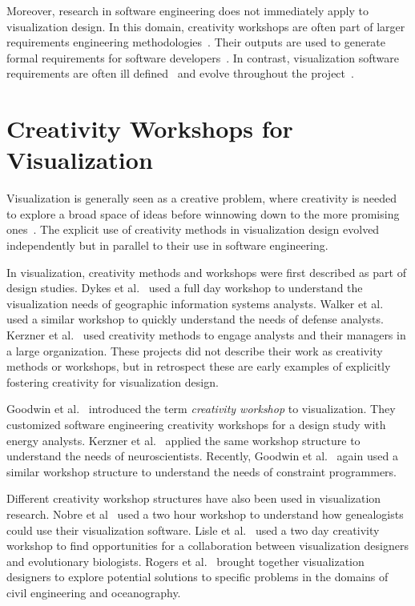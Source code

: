 Moreover, research in software engineering does not immediately apply to visualization design. In this domain, creativity workshops are often part of larger requirements engineering methodologies~\cite{Jones2005}. Their outputs are used to generate formal requirements for software developers~\cite{Maiden2005}. In contrast, visualization software requirements are often ill defined~\cite{Sedlmair2012} and evolve throughout the project~\cite{McCurdy2016_Action}.

\section{Creativity Workshops for Visualization}

Visualization is generally seen as a creative problem, where creativity is needed to explore a broad space of ideas before winnowing down to the more promising ones~\cite{Munzner2009,McKenna2014,Sedlmair2012}. The explicit use of creativity methods in visualization design evolved independently but in parallel to their use in software engineering. 

In visualization, creativity methods and workshops were first described as part of design studies. Dykes et al.~\cite{Dykes2010} used a full day workshop to understand the visualization needs of geographic information systems analysts. Walker et al.~\cite{Walker2013} used a similar workshop to quickly understand the needs of defense analysts. Kerzner et al.~\cite{Kerzner2015} used creativity methods to engage analysts and their managers in a large organization. These projects did not describe their work as creativity methods or workshops, but in retrospect these are early examples of explicitly fostering creativity for visualization design.

Goodwin et al.~\cite{Goodwin2013} introduced the term \emph{creativity workshop} to visualization. They customized software engineering creativity workshops for a design study with energy analysts. Kerzner et al.~\cite{Kerzner2017} applied the same workshop structure to understand the needs of neuroscientists. Recently, Goodwin et al.~\cite{Goodwin2016} again used a similar workshop structure to understand the needs of constraint programmers.

Different creativity workshop structures have also been used in visualization research. Nobre et al~\cite{Nobre2017} used a two hour workshop to understand how genealogists could use their visualization software. Lisle et al.~\cite{Lisle2017} used a two day creativity workshop to find opportunities for a collaboration between visualization designers and evolutionary biologists. Rogers et al.~\cite{Rogers2016} brought together visualization designers to explore potential solutions to specific problems in the domains of civil engineering and oceanography.

